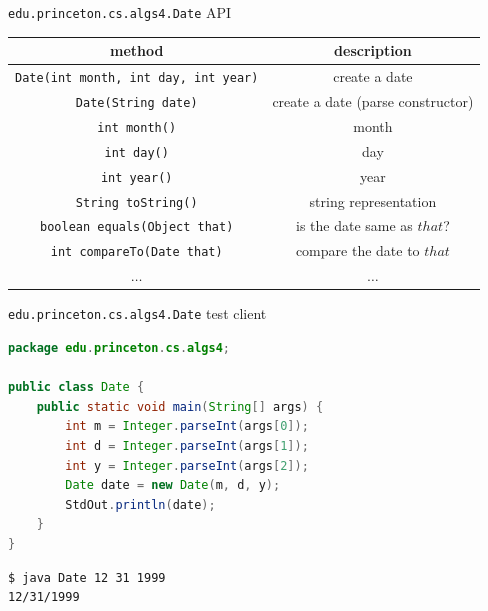 \documentclass[8pt,a4paper,compress]{beamer}
\begin{document}
\begin{frame}[fragile]
\pause

\lstinline{edu.princeton.cs.algs4.Date} API
\begin{center}
\begin{tabular}{cc}
method & description \\ \hline
\lstinline$Date(int month, int day, int year)$ & create a date \\
\lstinline$Date(String date)$ & create a date (parse constructor) \\
\lstinline$int month()$ &  month \\
\lstinline$int day()$ & day \\
\lstinline$int year()$ & year \\
\lstinline$String toString()$ & string representation \\
\lstinline$boolean equals(Object that)$ & is the date same as $that$? \\
\lstinline$int compareTo(Date that)$ & compare the date to $that$ \\
$\dots$ & $\dots$
\end{tabular} 
\end{center}

\pause

\lstinline{edu.princeton.cs.algs4.Date} test client
\begin{lstlisting}[language=Java]
package edu.princeton.cs.algs4;

public class Date {
    public static void main(String[] args) {
        int m = Integer.parseInt(args[0]);
        int d = Integer.parseInt(args[1]);
        int y = Integer.parseInt(args[2]);
        Date date = new Date(m, d, y);
        StdOut.println(date);
    }
}
\end{lstlisting}

\pause

\begin{lstlisting}[language={}]
$ java Date 12 31 1999
12/31/1999
\end{lstlisting}
\end{frame}
\end{document}
